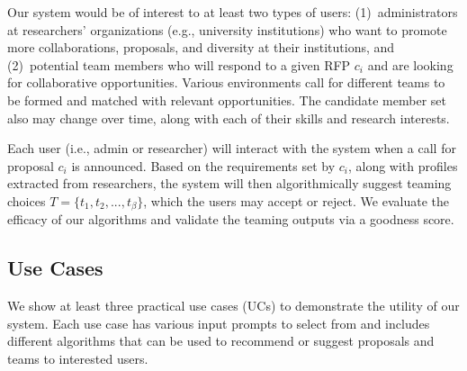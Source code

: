 Our system would be of interest to at least two types of users: (1)~administrators at researchers’ organizations (e.g., university institutions) who want to promote more collaborations, proposals, and diversity at their institutions, and (2)~potential team members who will respond to a given RFP $c_i$ and are looking for collaborative opportunities. %
Various environments call for different teams to be formed and matched with relevant opportunities. The candidate member set also may change over time, along with each of their skills and research interests. 


Each user (i.e., admin or researcher) will interact with the system when a call for proposal $c_i$ is announced. Based on the requirements set by $c_i$, along with profiles extracted from researchers, the system will then algorithmically suggest teaming choices $T=\{t_1, t_2, ..., t_\beta\}$, which the users may accept or reject. We evaluate the efficacy of our algorithms and validate the teaming outputs via a goodness score. %

\subsection{Use Cases} \label{subsec:usecases}
We show at least three practical use cases (UCs) to demonstrate the utility of our system. Each use case has various input prompts to select from and includes different algorithms that can be used to recommend or suggest proposals and teams to interested users. 


